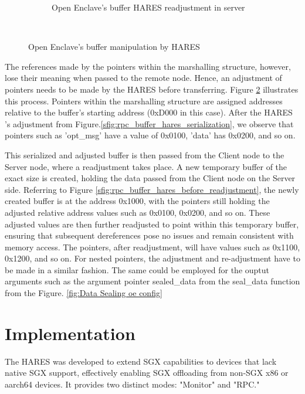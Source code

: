 \documentclass[article, doublespace,nopageskip]{VTthesis} %
\newcommand{\monitor}{HARES }
\begin{document}
{\begin{figure}[H]
\begin{subfigure}{\textwidth}
            \caption{Open Enclave's buffer HARES readjustment in server}
            \label{sfig:rpc_buffer_hares_after_readjustment}
        \end{subfigure}
        \\[20pt]
        \caption{Open Enclave's buffer manipulation by HARES}
        \label{fig:HARES-Serialization}
    \end{figure}
}

    The references made by the pointers within the marshalling structure, however, lose their meaning when passed to the remote node. Hence, an adjustment of pointers needs to be made by the \monitor before transferring. Figure \ref{fig:HARES-Serialization} illustrates this process. Pointers within the marshalling structure are assigned addresses relative to the buffer's starting address (0xD000 in this case). After the \monitor's adjustment from Figure.\ref{sfig:rpc_buffer_hares_serialization}, we observe that pointers such as 'opt\_msg' have a value of 0x0100, 'data' has 0x0200, and so on.
    
    This serialized and adjusted buffer is then passed from the Client node to the Server node, where a readjustment takes place. A new temporary buffer of the exact size is created, holding the data passed from the Client node on the Server side. Referring to Figure \ref{sfig:rpc_buffer_hares_before_readjustment}, the newly created buffer is at the address 0x1000, with the pointers still holding the adjusted relative address values such as 0x0100, 0x0200, and so on. These adjusted values are then further readjusted to point within this temporary buffer, ensuring that subsequent dereferences pose no issues and remain consistent with memory access. The pointers, after readjustment, will have values such as 0x1100, 0x1200, and so on. For nested pointers, the adjustment and re-adjustment have to be made in a similar fashion. The same could be employed for the ouptut arguments such as the argument pointer sealed\_data from the seal\_data function from the Figure. \ref{fig:Data Sealing oe config}

    \chapter{Implementation}
    The \monitor was developed to extend SGX capabilities to devices that lack native SGX support, effectively enabling SGX offloading from non-SGX x86 or aarch64 devices. It provides two distinct modes: "Monitor" and "RPC."
\end{document}
